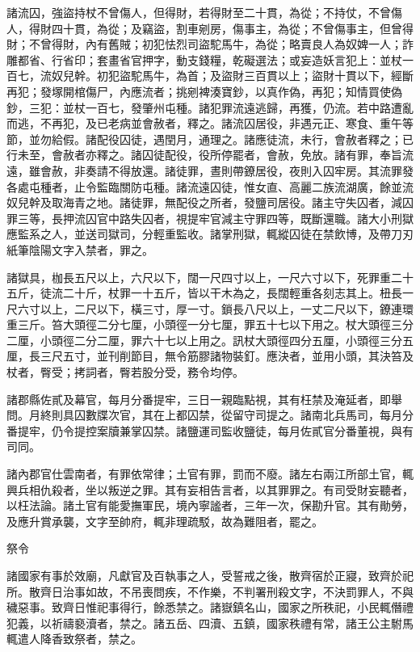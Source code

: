 \begin{pinyinscope}
 諸流囚，強盜持杖不曾傷人，但得財，若得財至二十貫，為從；不持仗，不曾傷人，得財四十貫，為從；及竊盜，割車剜房，傷事主，為從；不曾傷事主，但曾得財；不曾得財，內有舊賊；初犯怯烈司盜駝馬牛，為從；略賣良人為奴婢一人；詐雕都省、行省印；套畫省官押字，動支錢糧，乾礙選法；或妄造妖言犯上：並杖一百七，流奴兒幹。初犯盜駝馬牛，為首；及盜財三百貫以上；盜財十貫以下，經斷再犯；發塚開棺傷尸，內應流者；挑剜裨湊寶鈔，以真作偽，再犯；知情買使偽鈔，三犯：並杖一百七，發肇州屯種。諸犯罪流遠逃歸，再獲，仍流。若中路遭亂而逃，不再犯，及已老病並會赦者，釋之。諸流囚居役，非遇元正、寒食、重午等節，並勿給假。諸配役囚徒，遇閏月，通理之。諸應徒流，未行，會赦者釋之；已行未至，會赦者亦釋之。諸囚徒配役，役所停罷者，會赦，免放。諸有罪，奉旨流遠，雖會赦，非奏請不得放還。諸徒罪，晝則帶鐐居役，夜則入囚牢房。其流罪發各處屯種者，止令監臨關防屯種。諸流遠囚徒，惟女直、高麗二族流湖廣，餘並流奴兒幹及取海青之地。諸徒罪，無配役之所者，發鹽司居役。諸主守失囚者，減囚罪三等，長押流囚官中路失囚者，視提牢官減主守罪四等，既斷還職。諸大小刑獄應監系之人，並送司獄司，分輕重監收。諸掌刑獄，輒縱囚徒在禁飲博，及帶刀刃紙筆陰陽文字入禁者，罪之。



 諸獄具，枷長五尺以上，六尺以下，闊一尺四寸以上，一尺六寸以下，死罪重二十五斤，徒流二十斤，杖罪一十五斤，皆以干木為之，長闊輕重各刻志其上。杻長一尺六寸以上，二尺以下，橫三寸，厚一寸。鎖長八尺以上，一丈二尺以下，鐐連環重三斤。笞大頭徑二分七厘，小頭徑一分七厘，罪五十七以下用之。杖大頭徑三分二厘，小頭徑二分二厘，罪六十七以上用之。訊杖大頭徑四分五厘，小頭徑三分五厘，長三尺五寸，並刊削節目，無令筋膠諸物裝釘。應決者，並用小頭，其決笞及杖者，臀受；拷詞者，臀若股分受，務令均停。



 諸郡縣佐貳及幕官，每月分番提牢，三日一親臨點視，其有枉禁及淹延者，即舉問。月終則具囚數牒次官，其在上都囚禁，從留守司提之。諸南北兵馬司，每月分番提牢，仍令提控案牘兼掌囚禁。諸鹽運司監收鹽徒，每月佐貳官分番董視，與有司同。



 諸內郡官仕雲南者，有罪依常律；土官有罪，罰而不廢。諸左右兩江所部土官，輒興兵相仇殺者，坐以叛逆之罪。其有妄相告言者，以其罪罪之。有司受財妄聽者，以枉法論。諸土官有能愛撫軍民，境內寧謐者，三年一次，保勘升官。其有勛勞，及應升賞承襲，文字至帥府，輒非理疏駁，故為難阻者，罷之。



 祭令



 諸國家有事於效廟，凡獻官及百執事之人，受誓戒之後，散齊宿於正寢，致齊於祀所。散齊日治事如故，不吊喪問疾，不作樂，不判署刑殺文字，不決罰罪人，不與穢惡事。致齊日惟祀事得行，餘悉禁之。諸嶽鎮名山，國家之所秩祀，小民輒僭禮犯義，以祈禱褻瀆者，禁之。諸五岳、四瀆、五鎮，國家秩禮有常，諸王公主駙馬輒遣人降香致祭者，禁之。




\end{pinyinscope}
